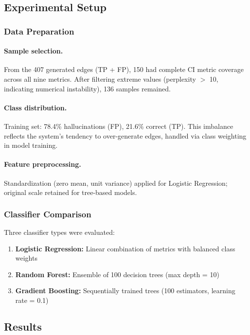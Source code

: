 \subsection{Experimental Setup}

\subsubsection{Data Preparation}

\paragraph{Sample selection.} From the 407 generated edges (TP + FP), 150 had complete CI metric coverage across all nine metrics. After filtering extreme values (perplexity $>$ 10, indicating numerical instability), 136 samples remained.

\paragraph{Class distribution.} Training set: 78.4\% hallucinations (FP), 21.6\% correct (TP). This imbalance reflects the system's tendency to over-generate edges, handled via class weighting in model training.

\paragraph{Feature preprocessing.} Standardization (zero mean, unit variance) applied for Logistic Regression; original scale retained for tree-based models.

\subsubsection{Classifier Comparison}

Three classifier types were evaluated:
\begin{enumerate}
    \item \textbf{Logistic Regression:} Linear combination of metrics with balanced class weights
    \item \textbf{Random Forest:} Ensemble of 100 decision trees (max depth = 10)
    \item \textbf{Gradient Boosting:} Sequentially trained trees (100 estimators, learning rate = 0.1)
\end{enumerate}

\subsection{Results}

